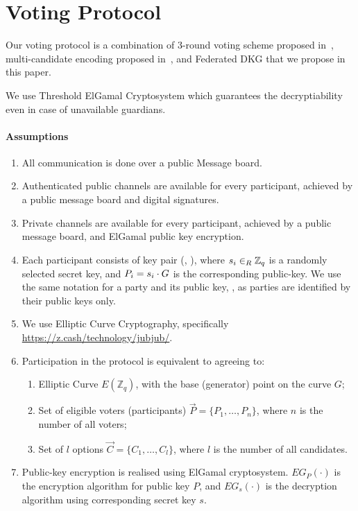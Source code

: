 \documentclass{article}
\begin{document}
\newcommand{\SharePartialDecryptionFromTo}[2]{\ensuremath{[\mathrm{PD}_{#1}]_{#2}}}

\newcommand{\PartialDecryptionFrom}[1]{\ensuremath{\mathrm{PD}_{#1}}}

\section{Voting Protocol}
Our voting protocol is a combination of 3-round voting scheme proposed in~\cite{schoenmakersLectureNotesCryptographic2018}, multi-candidate encoding proposed in~\cite{haoAnonymousVotingTworound2010}, and Federated DKG that we propose in this paper. 

We use Threshold ElGamal Cryptosystem which guarantees the decryptiability even in case of unavailable guardians.

\paragraph*{Assumptions}
\begin{enumerate}
    \item All communication is done over a public Message board.
    \item Authenticated public channels are available for every participant, achieved by a public message board and digital signatures.
    \item Private channels are available for every participant, achieved by a public message board, and ElGamal public key encryption.
    \item Each participant  consists of key pair (, ), where $s_{i} \in_{R} \mathbb{Z}_q$ is a randomly selected secret key, and $P_{i} = s_{i} \cdot G$ is the corresponding public-key. We use the same notation for a party and its public key, , as parties are identified by their public keys only.
    \item We use Elliptic Curve Cryptography, specifically \href{babyJubJub curve}{https://z.cash/technology/jubjub/}.
    \item Participation in the protocol is equivalent to agreeing to: \begin{enumerate}
        \item Elliptic Curve $E(\mathbb{Z}_q)$, with the base (generator) point on the curve $G$;
        \item Set of eligible voters (participants) $\vec{P}=\{P_1,\dots,P_n\}$, where $n$ is the number of all voters;
        \item Set of $l$ options $\vec{C}=\{C_1, \dots, C_l\}$, where $l$ is the number of all candidates. %
    \end{enumerate}
    \item Public-key encryption is realised using ElGamal cryptosystem. $EG_{P}(\cdot)$ is the encryption algorithm for public key $P$, and $EG_{s}(\cdot)$ is the decryption algorithm using corresponding secret key $s$.
\end{enumerate}
\end{document}
